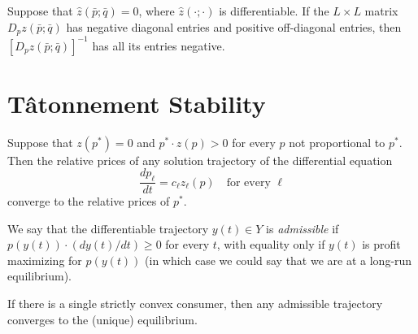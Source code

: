 \begin{prop}
    Suppose that $\hat{z} (\bar{p}; \bar{q}) = 0$, where $\hat{z}(\cdot; \cdot)$ is differentiable. If the $L \times L$ matrix $D_p z(\bar{p}; \bar{q})$ has negative diagonal entries and positive off-diagonal entries, then $[D_p z(\bar{p}; \bar{q})]^{-1}$ has all its entries negative.
\end{prop}


\section{Tâtonnement Stability}

\begin{prop}
    Suppose that $z(p^*) = 0$ and $p^* \cdot z(p) > 0$ for every $p$ not proportional to $p^*$. Then the relative prices of any solution trajectory of the differential equation 
    \begin{equation*}
        \frac{d p_\ell}{dt} = c_\ell z_\ell(p) \quad \text{for every } \ell
    \end{equation*}
    converge to the relative prices of $p^*$.
\end{prop}

\begin{defn}
    We say that the differentiable trajectory $y(t) \in Y$ is \emph{admissible} if $p(y(t)) \cdot (dy(t)/dt) \geq 0$ for every $t$, with equality only if $y(t)$ is profit maximizing for $p(y(t))$ (in which case we could say that we are at a long-run equilibrium).
\end{defn}

\begin{prop}
    If there is a single strictly convex consumer, then any admissible trajectory converges to the (unique) equilibrium.
\end{prop}

